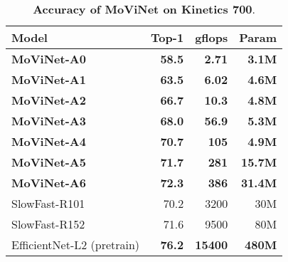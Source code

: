 \documentclass[final]{cvpr}
\newcommand{\ournet}{MoViNet\xspace} \newcommand{\ournets}{\ournet{}s\xspace}
\begin{document}
\begin{table}[tbp]
    \newcommand{\frameinput}[2]{#1#2}
    \begin{center}
\footnotesize
\begin{tabularx}{0.8\columnwidth}{@{}Xrrr@{}}
    \toprule
        \sc Model & \sc Top-1 & \sc gflops & \sc Param \\
\midrule
        \bf \ournet-A0 & \bf 58.5 & \bf 2.71 & \bf 3.1M \\
    \midrule
        \bf \ournet-A1 & \bf 63.5 & \bf 6.02 & \bf 4.6M \\
    \midrule
        \bf \ournet-A2 & \bf 66.7 & \bf 10.3 & \bf 4.8M \\
    \midrule
        \bf \ournet-A3 & \bf 68.0 & \bf 56.9 & \bf 5.3M \\
    \midrule
        \bf \ournet-A4 & \bf 70.7 & \bf 105 & \bf 4.9M \\
    \midrule
        \bf \ournet-A5 & \bf 71.7 & \bf 281 & \bf 15.7M \\
    \midrule
        \bf \ournet-A6 & \bf 72.3 & \bf 386 & \bf 31.4M \\
        SlowFast-R101 \cite{feichtenhofer2019slowfast, activitynet2020} & 70.2 & 3200 & 30M \\
        SlowFast-R152 \cite{feichtenhofer2019slowfast, activitynet2020} & 71.6 & 9500 & 80M \\
    \midrule
EfficientNet-L2 (pretrain) \cite{xie2020self, activitynet2020} & \bf 76.2 & \bf 15400 & \bf 480M \\
    \bottomrule
    \end{tabularx}
\end{center}
    \caption{
        {\bf Accuracy of \ournet on Kinetics 700}.
    }
    \label{table:k700-comparison}
\end{table}
\end{document}
